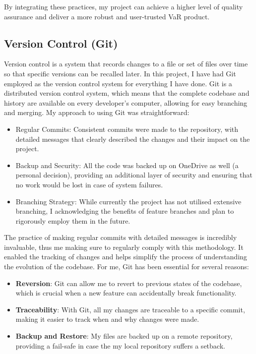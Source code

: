 \documentclass{article}
\begin{document}
By integrating these practices, my project can achieve a higher level of quality assurance and deliver a more robust and user-trusted VaR product.

\subsection{Version Control (Git)} 

Version control is a system that records changes to a file or set of files over time so that specific versions can be recalled later. In this project, I have had Git employed as the version control system for everything I have done.
Git is a distributed version control system, which means that the complete codebase and history are available on every developer's computer, allowing for easy branching and merging. My approach to using Git was straightforward:

\begin{itemize}
    \item Regular Commits: Consistent commits were made to the repository, with detailed messages that clearly described the changes and their impact on the project.
    \item Backup and Security: All the code was backed up on OneDrive as well (a personal decision), providing an additional layer of security and ensuring that no work would be lost in case of system failures.
    \item Branching Strategy: While currently the project has not utilised extensive branching, I acknowledging the  benefits of feature branches and plan to rigorously employ them in the future.
\end{itemize}

The practice of making regular commits with detailed messages is incredibly invaluable, thus me making sure to regularly comply with this methodology. It enabled the tracking of changes and helps simplify the process of understanding the evolution of the codebase. For me, Git has been essential for several reasons:

\begin{itemize}
    \item \textbf{Reversion}: Git can allow me to revert to previous states of the codebase, which is crucial when a new feature can accidentally break functionality.
    \item \textbf{Traceability}: With Git, all my changes are traceable to a specific commit, making it easier to track when and why changes were made.
    \item \textbf{Backup and Restore}: My files are backed up on a remote repository, providing a fail-safe in case the my local repository suffers a setback.
\end{itemize}
\end{document}
